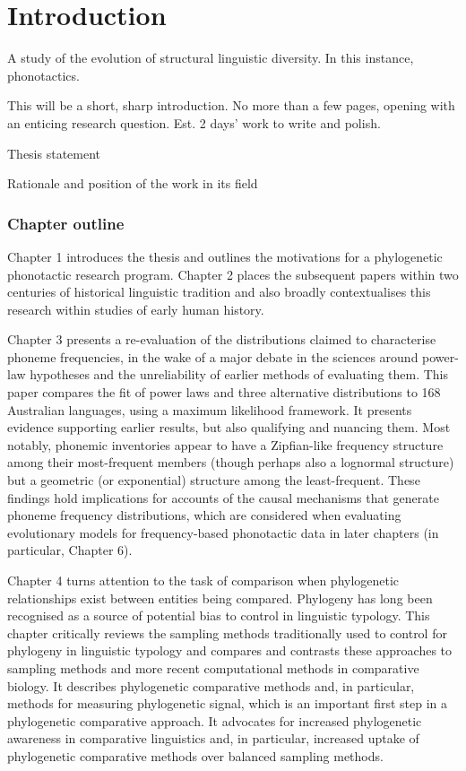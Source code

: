 \chapter[Introduction]{Introduction}
\label{Chap:Intro}


A study of the evolution of structural linguistic diversity. In this instance, phonotactics.

This will be a short, sharp introduction. No more than a few pages, opening with an enticing research question. Est. 2 days' work to write and polish.

Thesis statement

Rationale and position of the work in its field

\hypertarget{chapter-outline}{%
\subsection{Chapter outline}\label{chapter-outline}}

Chapter 1 introduces the thesis and outlines the motivations for a phylogenetic phonotactic research program. Chapter 2 places the subsequent papers within two centuries of historical linguistic tradition and also broadly contextualises this research within studies of early human history.

Chapter 3 presents a re-evaluation of the distributions claimed to characterise phoneme frequencies, in the wake of a major debate in the sciences around power-law hypotheses and the unreliability of earlier methods of evaluating them. This paper compares the fit of power laws and three alternative distributions to 168 Australian languages, using a maximum likelihood framework. It presents evidence supporting earlier results, but also qualifying and nuancing them. Most notably, phonemic inventories appear to have a Zipfian-like frequency structure among their most-frequent members (though perhaps also a lognormal structure) but a geometric (or exponential) structure among the least-frequent. These findings hold implications for accounts of the causal mechanisms that generate phoneme frequency distributions, which are considered when evaluating evolutionary models for frequency-based phonotactic data in later chapters (in particular, Chapter 6).

Chapter 4 turns attention to the task of comparison when phylogenetic relationships exist between entities being compared. Phylogeny has long been recognised as a source of potential bias to control in linguistic typology. This chapter critically reviews the sampling methods traditionally used to control for phylogeny in linguistic typology and compares and contrasts these approaches to sampling methods and more recent computational methods in comparative biology. It describes phylogenetic comparative methods and, in particular, methods for measuring phylogenetic signal, which is an important first step in a phylogenetic comparative approach. It advocates for increased phylogenetic awareness in comparative linguistics and, in particular, increased uptake of phylogenetic comparative methods over balanced sampling methods.

